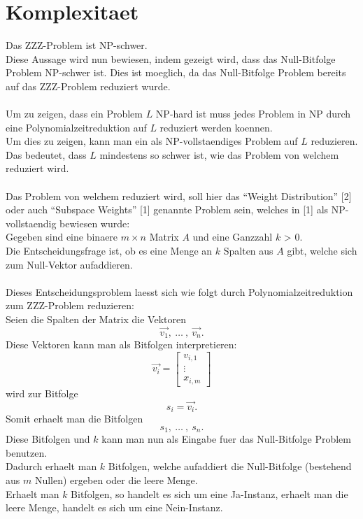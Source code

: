 \documentclass[a4paper,10pt,ngerman]{scrartcl}
\begin{document}
\section{Komplexitaet}
Das ZZZ-Problem ist NP-schwer.\\
Diese Aussage wird nun bewiesen, indem gezeigt wird, dass das Null-Bitfolge Problem NP-schwer ist. Dies ist moeglich, da das Null-Bitfolge Problem bereits auf das ZZZ-Problem reduziert wurde.
\\
\\Um zu zeigen, dass ein Problem $L$ NP-hard ist muss jedes Problem in NP durch eine Polynomialzeitreduktion auf $L$ reduziert werden koennen.
\\Um dies zu zeigen, kann man ein als NP-vollstaendiges Problem auf $L$ reduzieren. Das bedeutet, dass $L$ mindestens so schwer ist, wie das Problem von welchem reduziert wird.\\
\\
Das Problem von welchem reduziert wird, soll hier das "`Weight Distribution"' [2] oder auch "`Subspace Weights"' [1] genannte Problem sein, welches in [1] als NP-vollstaendig bewiesen wurde:\\
Gegeben sind eine binaere $m \times n$ Matrix $A$ und eine Ganzzahl $k$ > 0.\\
Die Entscheidungsfrage ist, ob es eine Menge an $k$ Spalten aus $A$ gibt, welche sich zum Null-Vektor aufaddieren.
\\\\
Dieses Entscheidungsproblem laesst sich wie folgt durch Polynomialzeitreduktion zum ZZZ-Problem reduzieren:\\
Seien die Spalten der Matrix die Vektoren
$$
\vec{v_1}, \ \dots \ , \ \vec{v_n}.
$$
Diese Vektoren kann man als Bitfolgen interpretieren:
$$
\vec{v_i} = \begin{bmatrix}
           v_{i, 1} \\
           \vdots \\
           x_{i, m}
         \end{bmatrix} 
$$
wird zur Bitfolge 
$$
s_i = \vec{v_i}.
$$
Somit erhaelt man die Bitfolgen
$$
s_1, \ \dots \ , \ s_n.
$$
Diese Bitfolgen und $k$ kann man nun als Eingabe fuer das Null-Bitfolge Problem benutzen. 
\\
Dadurch erhaelt man $k$ Bitfolgen, welche aufaddiert die Null-Bitfolge (bestehend aus $m$ Nullen) ergeben oder die leere Menge.
\\Erhaelt man $k$ Bitfolgen, so handelt es sich um eine Ja-Instanz, erhaelt man die leere Menge, handelt es sich um eine Nein-Instanz.
\end{document}
